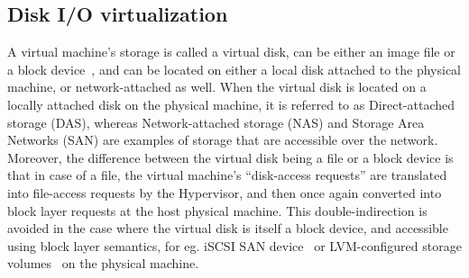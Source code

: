\subsection{Disk I/O virtualization}
A virtual machine's storage is called a virtual disk, can be either
an image file or a block device~\cite{ip-networked-storage}, and can be 
located on either a local disk attached to the 
physical machine, or network-attached as well.
When the virtual disk is located on a locally attached disk on the 
physical machine, it is referred to as Direct-attached 
storage (DAS),
whereas Network-attached storage (NAS) and Storage Area Networks (SAN)
are examples of storage that are accessible over the network.
Moreover, the difference between the virtual disk being a file or a
block device is that in case of a file, the virtual machine's ``disk-access
requests'' are translated into file-access requests by the Hypervisor, 
and then once again converted into block layer requests at the host
physical machine. This double-indirection is avoided in the case
where the virtual disk is itself a block device, and accessible using
block layer semantics, for 
eg. iSCSI
SAN device~\cite{iscsi} or 
LVM-configured
storage volumes~\cite{lvm} on the physical machine.




